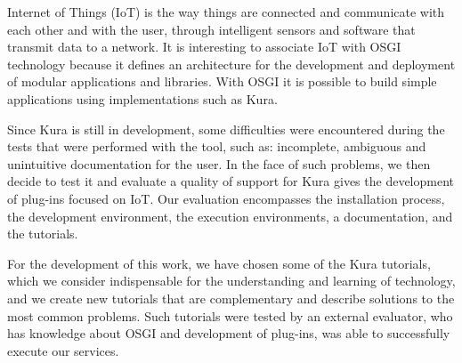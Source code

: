Internet of Things (IoT) is the way things are connected and communicate with each other and with the user, through intelligent sensors and software that transmit data to a network. It is interesting to associate IoT with OSGI technology because it defines an architecture for the development and deployment of modular applications and libraries. With OSGI it is possible to build simple applications using implementations such as Kura.

\setlength{\parindent}{5ex} Since Kura is still in development, some difficulties were encountered during the tests that were performed with the tool, such as: incomplete, ambiguous and unintuitive documentation for the user. In the face of such problems, we then decide to test it and evaluate a quality of support for Kura gives the development of plug-ins focused on IoT. Our evaluation encompasses the installation process, the development environment, the execution environments, a documentation, and the tutorials. \par

For the development of this work, we have chosen some of the Kura tutorials, which we consider indispensable for the understanding and learning of technology, and we create new tutorials that are complementary and describe solutions to the most common problems. Such tutorials were tested by an external evaluator, who has knowledge about OSGI and development of plug-ins, was able to successfully execute our services. 